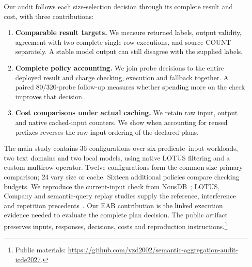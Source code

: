 Our audit follows each size-selection decision through its complete result and cost, with three contributions:
\begin{enumerate}
\item \textbf{Comparable result targets.} We measure returned labels, output validity, agreement with two complete single-row executions, and source COUNT separately. A stable model output can still disagree with the supplied labels.
\item \textbf{Complete policy accounting.} We join probe decisions to the entire deployed result and charge checking, execution and fallback together. A paired 80/320-probe follow-up measures whether spending more on the check improves that decision.
\item \textbf{Cost comparisons under actual caching.} We retain raw input, output and native cached-input counters. We show when accounting for reused prefixes reverses the raw-input ordering of the declared plans.
\end{enumerate}

The main study contains 36 configurations over six predicate--input workloads, two text domains and two local models, using native LOTUS filtering and a custom multirow operator. Twelve configurations form the common-size primary comparison; 24 vary size or cache. Sixteen additional policies compare checking budgets. We reproduce the current-input check from NousDB~\cite{nousdb}; LOTUS, Company and semantic-query replay studies supply the reference, interference and repetition precedents~\cite{lotus,company,runvariance}. Our EAB contribution is the linked execution evidence needed to evaluate the complete plan decision. The public artifact preserves inputs, responses, decisions, costs and reproduction instructions.\footnote{\raggedright Public materials: \url{https://github.com/yzd2002/semantic-aggregation-audit-icde2027}.}
